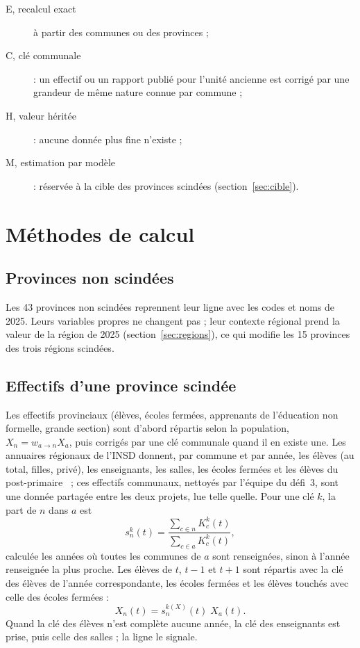 \documentclass{article}
\begin{document}
\begin{description}
\item[E, recalcul exact] à partir des communes ou des provinces ;
\item[C, clé communale] : un effectif ou un rapport publié pour l'unité ancienne est corrigé par une grandeur de même nature connue par commune ;
\item[H, valeur héritée] : aucune donnée plus fine n'existe ;
\item[M, estimation par modèle] : réservée à la cible des provinces scindées (section~\ref{sec:cible}).
\end{description}

\section{Méthodes de calcul}

\subsection{Provinces non scindées}

Les 43 provinces non scindées reprennent leur ligne avec les codes et noms de 2025. Leurs variables propres ne changent pas ; leur contexte régional prend la valeur de la région de 2025 (section~\ref{sec:regions}), ce qui modifie les 15 provinces des trois régions scindées.

\subsection{Effectifs d'une province scindée}

Les effectifs provinciaux (élèves, écoles fermées, apprenants de l'éducation non formelle, grande section) sont d'abord répartis selon la population, $X_n = w_{a \to n} X_a$, puis corrigés par une clé communale quand il en existe une. Les annuaires régionaux de l'INSD donnent, par commune et par année, les élèves (au total, filles, privé), les enseignants, les salles, les écoles fermées et les élèves du post-primaire~\cite{insd_annuaires} ; ces effectifs communaux, nettoyés par l'équipe du défi~3, sont une donnée partagée entre les deux projets, lue telle quelle. Pour une clé $k$, la part de $n$ dans $a$ est
\begin{equation}
s^{k}_{n}(t) = \frac{\sum_{c \in n} K^{k}_{c}(t)}{\sum_{c \in a} K^{k}_{c}(t)},
\end{equation}
calculée les années où toutes les communes de $a$ sont renseignées, sinon à l'année renseignée la plus proche. Les élèves de $t$, $t-1$ et $t+1$ sont répartis avec la clé des élèves de l'année correspondante, les écoles fermées et les élèves touchés avec celle des écoles fermées :
\begin{equation}
X_n(t) = s^{k(X)}_{n}(t)\; X_a(t).
\end{equation}
Quand la clé des élèves n'est complète aucune année, la clé des enseignants est prise, puis celle des salles ; la ligne le signale.
\end{document}
